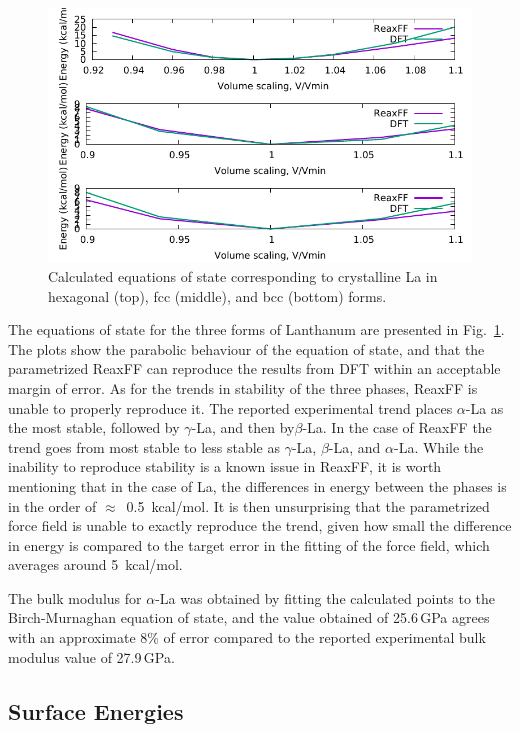 \documentclass[journal=jpcafh,manuscript=article]{achemso}
\begin{document}
\begin{figure}[hbtp]
\centering
\includegraphics[scale=1]{three-La-eos.pdf}
\caption{Calculated equations of state corresponding to crystalline La in hexagonal (top), fcc (middle), and bcc (bottom) forms.}
\label{fig:laeos}
\end{figure}

The equations of state for the three forms of Lanthanum are presented in Fig.~\ref{fig:laeos}.
The plots show the parabolic behaviour of the equation of state, and that the parametrized ReaxFF can reproduce the results from DFT within an acceptable margin of error.
As for the trends in stability of the three phases, ReaxFF is unable to properly reproduce it.
The reported experimental trend places $\alpha$-La as the most stable, followed by $\gamma$-La, and then by$\beta$-La.
In the case of ReaxFF the trend goes from most stable to less stable as $\gamma$-La, $\beta$-La, and $\alpha$-La.
While the inability to reproduce stability is a known issue in ReaxFF, it is worth mentioning that in the case of La, the differences in energy between the phases is in the order of $\approx$~0.5~kcal/mol.
It is then unsurprising that the parametrized force field is unable to exactly reproduce the trend,  given how small the difference in energy is compared to the target error in the fitting of the force field, which averages around 5~kcal/mol.

The bulk modulus for $\alpha$-La was obtained by fitting the calculated points to the Birch-Murnaghan equation of state\cite{fu_first-principles_1983}, and the value obtained of 25.6\,GPa agrees with an approximate 8\% of error compared to the reported experimental bulk modulus value of 27.9\,GPa.\cite{lide2003crc}

\subsection{Surface Energies}
\end{document}
